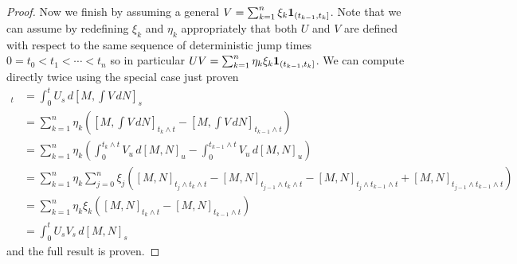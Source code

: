 \begin{proof}
Now we finish by assuming a general $V = \sum_{k=1}^n \xi_k \textbf{1}_{(t_{k-1},t_k]}$.  Note that we can assume by redefining $\xi_k$ and $\eta_k$ appropriately that both $U$ and $V$ are defined with respect to the same sequence of deterministic jump times $0=t_0 < t_1 < \dotsb < t_n$ so in particular $UV = \sum_{k=1}^n \eta_k \xi_k \textbf{1}_{(t_{k-1},t_k]}$.  We can compute directly twice using the special case just proven
\begin{align*}
[\int U \, dM , \int V \, dN]_t &= \int_0^t U_s \, d[M, \int V \, dN]_s \\
&= \sum_{k=1}^n \eta_k \left( [M, \int V \, dN]_{t_k \wedge t} - [M, \int V \, dN]_{t_{k-1} \wedge t} \right) \\
&= \sum_{k=1}^n \eta_k \left( \int_0 ^{t_k \wedge t} V_u \, d [M, N]_u - \int_0^{t_{k-1} \wedge t} V_u \,d [M, N]_u \right) \\
&= \sum_{k=1}^n \eta_k \sum_{j=0}^n  \xi_j \left( [M, N]_{t_j \wedge t_k\wedge t} - [M, N]_{t_{j-1} \wedge t_k \wedge t} - [M, N]_{t_j \wedge t_{k-1}\wedge t} + [M, N]_{t_{j-1} \wedge t_{k-1} \wedge t} \right) \\
&= \sum_{k=1}^n \eta_k  \xi_k \left( [M, N]_{t_k\wedge t} - [M, N]_{t_{k-1} \wedge t} \right) \\
&= \int_0^t U_s V_s \, d[M,N]_s
\end{align*}
and the full result is proven.
\end{proof}

